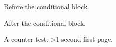 Before the conditional block.

After the conditional block.

A counter test: \ifnum\value{page}>1 second \else first \fi page.
